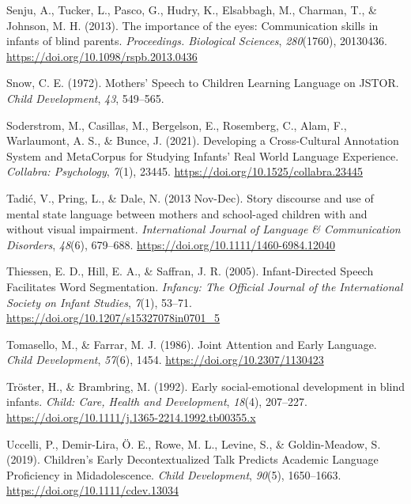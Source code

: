 \documentclass[
  man,floatsintext]{apa6}
\newlength{\cslhangindent}
\newlength{\cslentryspacingunit} %
\newenvironment{CSLReferences}[2] %
 {%
  \setlength{\parindent}{0pt}
  \ifodd #1
  \let\oldpar\par
  \def\par{\hangindent=\cslhangindent\oldpar}
  \fi
  \setlength{\parskip}{#2\cslentryspacingunit}
 }%
 {}
\begin{document}
\begin{CSLReferences}{1}{0}
\leavevmode{}%
Senju, A., Tucker, L., Pasco, G., Hudry, K., Elsabbagh, M., Charman, T., \& Johnson, M. H. (2013). The importance of the eyes: Communication skills in infants of blind parents. \emph{Proceedings. Biological Sciences}, \emph{280}(1760), 20130436. \url{https://doi.org/10.1098/rspb.2013.0436}

\leavevmode{}%
Snow, C. E. (1972). Mothers' {Speech} to {Children Learning Language} on {JSTOR}. \emph{Child Development}, \emph{43}, 549--565.

\leavevmode{}%
Soderstrom, M., Casillas, M., Bergelson, E., Rosemberg, C., Alam, F., Warlaumont, A. S., \& Bunce, J. (2021). Developing a {Cross-Cultural Annotation System} and {MetaCorpus} for {Studying Infants}' {Real World Language Experience}. \emph{Collabra: Psychology}, \emph{7}(1), 23445. \url{https://doi.org/10.1525/collabra.23445}

\leavevmode{}%
Tadić, V., Pring, L., \& Dale, N. (2013 Nov-Dec). Story discourse and use of mental state language between mothers and school-aged children with and without visual impairment. \emph{International Journal of Language \& Communication Disorders}, \emph{48}(6), 679--688. \url{https://doi.org/10.1111/1460-6984.12040}

\leavevmode{}%
Thiessen, E. D., Hill, E. A., \& Saffran, J. R. (2005). Infant-{Directed Speech Facilitates Word Segmentation}. \emph{Infancy: The Official Journal of the International Society on Infant Studies}, \emph{7}(1), 53--71. \url{https://doi.org/10.1207/s15327078in0701_5}

\leavevmode{}%
Tomasello, M., \& Farrar, M. J. (1986). Joint {Attention} and {Early Language}. \emph{Child Development}, \emph{57}(6), 1454. \url{https://doi.org/10.2307/1130423}

\leavevmode{}%
Tröster, H., \& Brambring, M. (1992). Early social-emotional development in blind infants. \emph{Child: Care, Health and Development}, \emph{18}(4), 207--227. \url{https://doi.org/10.1111/j.1365-2214.1992.tb00355.x}

\leavevmode{}%
Uccelli, P., Demir-Lira, Ö. E., Rowe, M. L., Levine, S., \& Goldin-Meadow, S. (2019). Children's {Early Decontextualized Talk Predicts Academic Language Proficiency} in {Midadolescence}. \emph{Child Development}, \emph{90}(5), 1650--1663. \url{https://doi.org/10.1111/cdev.13034}


\end{CSLReferences}
\end{document}
